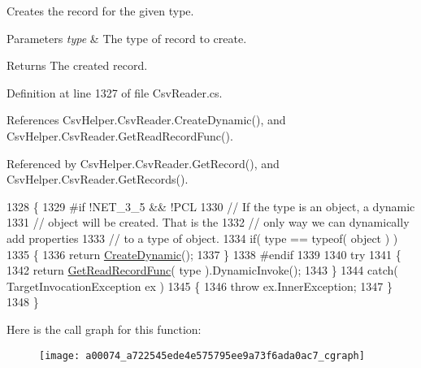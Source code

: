 Creates the record for the given type. 


\begin{DoxyParams}{Parameters}
{\em type} & The type of record to create.\\
\hline
\end{DoxyParams}
\begin{DoxyReturn}{Returns}
The created record.
\end{DoxyReturn}


Definition at line 1327 of file Csv\-Reader.\-cs.



References Csv\-Helper.\-Csv\-Reader.\-Create\-Dynamic(), and Csv\-Helper.\-Csv\-Reader.\-Get\-Read\-Record\-Func().



Referenced by Csv\-Helper.\-Csv\-Reader.\-Get\-Record(), and Csv\-Helper.\-Csv\-Reader.\-Get\-Records().


\begin{DoxyCode}
1328         \{
1329 \textcolor{preprocessor}{#if !NET\_3\_5 && !PCL
}
1330 \textcolor{preprocessor}{}            \textcolor{comment}{// If the type is an object, a dynamic}
1331             \textcolor{comment}{// object will be created. That is the}
1332             \textcolor{comment}{// only way we can dynamically add properties}
1333             \textcolor{comment}{// to a type of object.}
1334             \textcolor{keywordflow}{if}( type == typeof( \textcolor{keywordtype}{object} ) )
1335             \{
1336                 \textcolor{keywordflow}{return} \hyperlink{a00074_a4b6150b5ff8a85d9cf05aa1027554a50}{CreateDynamic}();
1337             \}
1338 \textcolor{preprocessor}{#endif
}
1339 \textcolor{preprocessor}{}
1340             \textcolor{keywordflow}{try}
1341             \{
1342                 \textcolor{keywordflow}{return} \hyperlink{a00074_a80a053f470462225c390208e27a1132a}{GetReadRecordFunc}( type ).DynamicInvoke();
1343             \}
1344             \textcolor{keywordflow}{catch}( TargetInvocationException ex )
1345             \{
1346                 \textcolor{keywordflow}{throw} ex.InnerException;
1347             \}
1348         \}
\end{DoxyCode}


Here is the call graph for this function\-:
\nopagebreak
\begin{figure}[H]
\begin{center}
\leavevmode
\texttt{[image: a00074\_a722545ede4e575795ee9a73f6ada0ac7\_cgraph]}
\end{center}
\end{figure}




